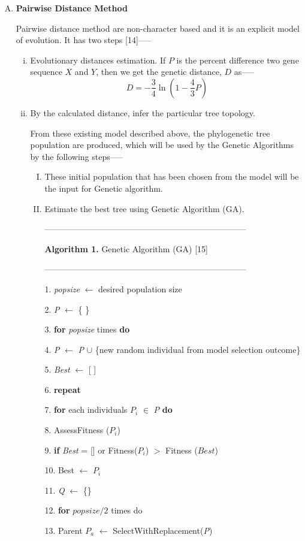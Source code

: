 \documentclass[preprint,12pt]{elsarticle}
\newcommand\tab[1][1cm]{\hspace*{#1}}
\begin{document}
\begin{enumerate}[a)]
\begin{enumerate}[(A)]
\item \textbf{Pairwise Distance Method}

Pairwise distance method are non-character based and it is an explicit model of evolution. It has two steps [14]—--
\begin{enumerate}[(i)]
\item Evolutionary distances estimation. If $P$ is the percent difference two gene sequence $X$ and $Y$, then we get the genetic distance, $D$ as—--
$$D=- \frac{3}{4} \ln(1-\frac{4}{3}P)$$
\item By the calculated distance, infer the particular tree topology.

From these existing model described above, the phylogenetic tree population are produced, which will be used by the Genetic Algorithms by the following steps—--
\begin{enumerate}[(I)]
\item These initial population that has been chosen from the model will be the input for Genetic algorithm.
\item Estimate the best tree using Genetic Algorithm (GA).

------------------------------------------------------------------------

\textbf{Algorithm 1.} Genetic Algorithm (GA) [15]

------------------------------------------------------------------------

1. \textit{popsize} $\gets$ desired population size

2. \textit{P} $\gets$ {\{ \}}

3. \textbf{for} \textit{popsize} times \textbf{do}

4. \tab \textit{P} $\gets$ \textit{P} $\cup$ {\{new random individual from model selection outcome\}}

5. \textit{Best} $\gets$ [ ]

6. \textbf{repeat}

7. \tab \textbf{for} each individuals $P_i$ $\in$ \textit{P} \textbf{do}

8. \tab \tab AssessFitness ($P_i$)

9. \tab \tab \textbf{if} \textit{Best} = [] or Fitness($P_i$) $>$ Fitness ($Best$)

10. \tab \tab \tab Best $\gets$ $P_i$

11. \tab \textit{Q} $\gets$ \{\}

12. \tab \textbf{for} $popsize/2$ times do

13. \tab \tab Parent $P_a$ $\gets$ SelectWithReplacement(\textit{P})


\end{enumerate}
\end{enumerate}
\end{enumerate}
\end{enumerate}
\end{document}
